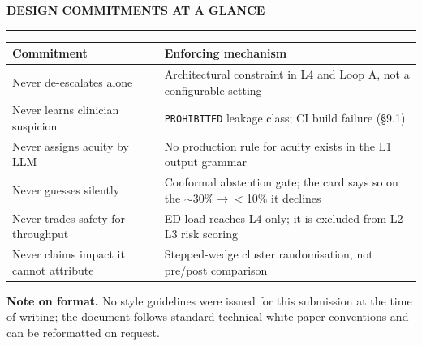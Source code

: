 \documentclass[10pt,a4paper,twocolumn]{article}
\begin{document}
\vspace{8pt}
{\sffamily\bfseries\small\color{NearBlack}DESIGN COMMITMENTS AT A GLANCE}\par
\vspace{-1pt}\textcolor{AccPurple}{\rule{\linewidth}{1pt}}\par\vspace{3pt}

{\footnotesize\sffamily
\begin{tabular}{@{}p{1.85cm}p{5.5cm}@{}}
\toprule
\rowcolor{AccPurple!10}
\textbf{Commitment} & \textbf{Enforcing mechanism}\\
\midrule
Never de-escalates alone & Architectural constraint in L4 and Loop A, not a
configurable setting\\
\addlinespace[2pt]
Never learns clinician suspicion & \texttt{PROHIBITED} leakage class; CI build
failure (\S9.1)\\
\addlinespace[2pt]
Never assigns acuity by LLM & No production rule for acuity exists in the L1
output grammar\\
\addlinespace[2pt]
Never guesses silently & Conformal abstention gate; the card says so on the
$\sim$30\%$\rightarrow$$<$10\% it declines\\
\addlinespace[2pt]
Never trades safety for throughput & ED load reaches L4 only; it is excluded
from L2--L3 risk scoring\\
\addlinespace[2pt]
Never claims impact it cannot attribute & Stepped-wedge cluster randomisation, not
pre/post comparison\\
\bottomrule
\end{tabular}}

\vspace{7pt}
{\scriptsize\color{MedGray}\textbf{Note on format.} No style guidelines were issued
for this submission at the time of writing; the document follows standard technical
white-paper conventions and can be reformatted on request.}
\end{document}
